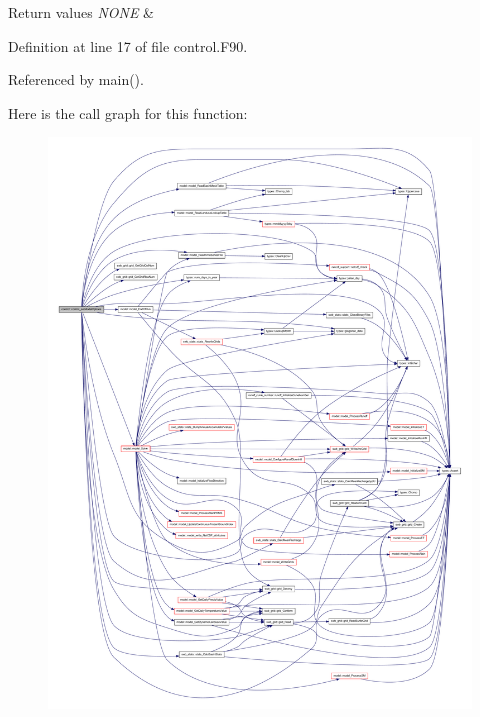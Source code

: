 \begin{DoxyRetVals}{Return values}
{\em NONE} & \\
\hline
\end{DoxyRetVals}


Definition at line 17 of file control.F90.



Referenced by main().



Here is the call graph for this function:\nopagebreak
\begin{figure}[H]
\begin{center}
\leavevmode
\includegraphics[width=400pt]{namespacecontrol_af1ae32af002bb43d83f3a2120d86e59c_cgraph}
\end{center}
\end{figure}


